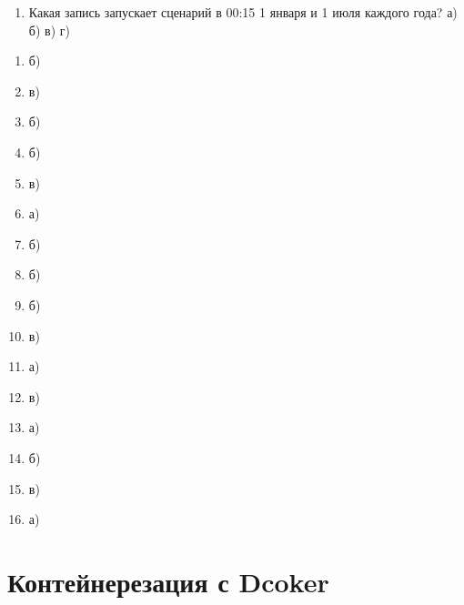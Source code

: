 \documentclass[letterpaper,10pt,russian]{sphinxmanual}
\begin{document}
\begin{enumerate}
\item {} 
\sphinxAtStartPar
Какая запись  запускает сценарий в 00:15 1 января и 1 июля каждого года?
а) 
б) 
в) 
г) 

\end{enumerate}

\sphinxAtStartPar
{}
\begin{enumerate}
%
\item {} 
\sphinxAtStartPar
б)

\item {} 
\sphinxAtStartPar
в)

\item {} 
\sphinxAtStartPar
б)

\item {} 
\sphinxAtStartPar
б)

\item {} 
\sphinxAtStartPar
в)

\item {} 
\sphinxAtStartPar
а)

\item {} 
\sphinxAtStartPar
б)

\item {} 
\sphinxAtStartPar
б)

\item {} 
\sphinxAtStartPar
б)

\item {} 
\sphinxAtStartPar
в)

\item {} 
\sphinxAtStartPar
а)

\item {} 
\sphinxAtStartPar
в)

\item {} 
\sphinxAtStartPar
а)

\item {} 
\sphinxAtStartPar
б)

\item {} 
\sphinxAtStartPar
в)

\item {} 
\sphinxAtStartPar
а)

\end{enumerate}


\chapter{Контейнерезация с Dcoker}
\label{\detokenize{index:dcoker}}
\sphinxstepscope
\end{document}
